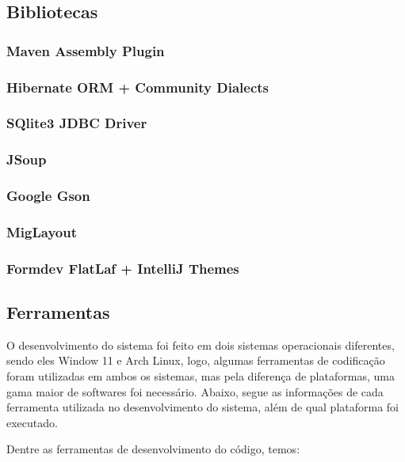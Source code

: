 \documentclass[a4paper,12pt]{article}
\begin{document}
\subsection{Bibliotecas}
\subsubsection{Maven Assembly Plugin}
\subsubsection{Hibernate ORM + Community Dialects}
\subsubsection{SQlite3 JDBC Driver}
\subsubsection{JSoup}
\subsubsection{Google Gson}
\subsubsection{MigLayout}
\subsubsection{Formdev FlatLaf + IntelliJ Themes}

\subsection{Ferramentas}
O desenvolvimento do sistema foi feito em dois sistemas operacionais diferentes, sendo eles Window 11 e Arch Linux, logo, algumas ferramentas 
de codificação foram utilizadas em ambos os sistemas, mas pela diferença de plataformas, uma gama maior de softwares foi necessário. Abaixo, segue 
as informações de cada ferramenta utilizada no desenvolvimento do sistema, além de qual plataforma foi executado.

Dentre as ferramentas de desenvolvimento do código, temos:
\end{document}
